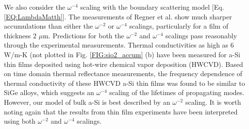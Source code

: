 \documentclass[aps,prb,onecolumn,preprint,superscriptaddress,footinbib,amsmath,amssymb,floatfix]{revtex4}
\begin{document}
We also consider the $\omega^{-4}$ scaling with the boundary 
scattering model [Eq. \eqref{EQ:LambdaMatth}]. 
The measurements of Regner et al. show much sharper accumulations 
than either the $\omega^{-2}$ or $\omega^{-4}$ scalings, 
particularly for a film of thickness $2$ $\mu$m. 
Predictions for both the $\omega^{-2}$ 
and $\omega^{-4}$ scalings pass reasonably 
through the experimental measurements. Thermal conductivities 
as high as 6 W/m-K (not plotted in Fig. \ref{FIG:sio2_accum} (b) 
have been measured for a-Si thin films deposited using 
hot-wire chemical vapor deposition (HWCVD). Based on time domain 
thermal reflectance measurements, the frequency dependence of  
thermal conductivity of these HWCVD a-Si thin films was found to be 
similar to SiGe alloys, which suggests an $\omega^{-4}$ scaling 
of the lifetimes of propagating modes. However, our model of 
bulk a-Si is best described by an $\omega^{-2}$ scaling. 
It is worth noting again 
that the results from thin film experiments have been interpreted 
using both $\omega^{-2}$ and $\omega^{-4}$ scalings.
\cite{feldman_thermal_1993,cahill_thermal_1994,
feldman_numerical_1999,zink_thermal_2006,
liu_high_2009,yang_anomalously_2010} 

\end{document}
